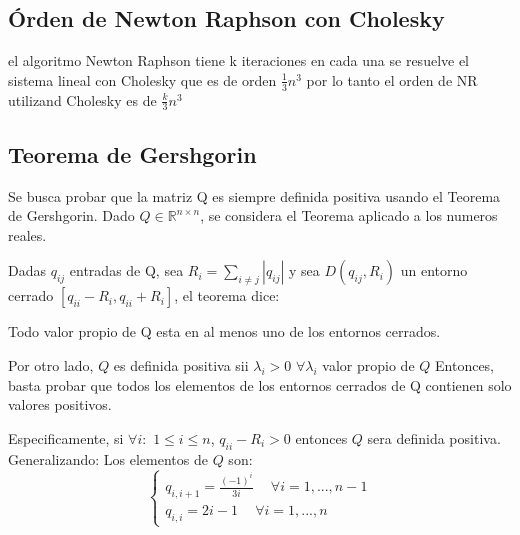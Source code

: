\documentclass{endm}
\begin{document}
\subsection{Órden de Newton Raphson con Cholesky}
el algoritmo Newton Raphson tiene k iteraciones en cada una se resuelve el sistema lineal con Cholesky que es de orden $\frac{1}{3}n^{3}$  por lo tanto el orden de NR utilizand Cholesky es de  $\frac{k}{3}n^{3}$

\subsection{Teorema de Gershgorin}
Se busca probar que la matriz Q es siempre definida positiva usando el Teorema de Gershgorin.
Dado $Q \in \mathbb{R}^{n \times n}$, se considera el Teorema aplicado a los numeros reales.

Dadas $q_{ij}$ entradas de Q, sea $R_i = \sum_{i \neq j}\left | q_{ij} \right |$ y sea $D(q_{ij},R_i)$
un entorno cerrado $ [q_{ii}-R_i, q_{ii}+R_i]$, el teorema dice:
\begin{thm}
    Todo valor propio de Q esta en al menos uno de los entornos cerrados.
\end{thm}

Por otro lado, $Q$ es definida positiva sii $\lambda_i > 0$ $\forall \lambda_i$ valor propio de $Q$
Entonces, basta probar que todos los elementos de los entornos cerrados de Q contienen solo valores positivos.

Especificamente, si $\forall i:$ $1 \leq i \leq n$, $q_{ii} - R_i >0$ entonces $Q$ sera definida positiva.
Generalizando:
Los elementos de $Q$ son:
\begin{equation}
    \begin{cases}
        q_{i,i+1} = \frac{(-1)^i}{3i} \phantom{-} \forall i = 1,...,n-1 \\
        q_{i,i} = 2i-1 \phantom{-} \forall i = 1,...,n
    \end{cases}
\end{equation}
\end{document}
